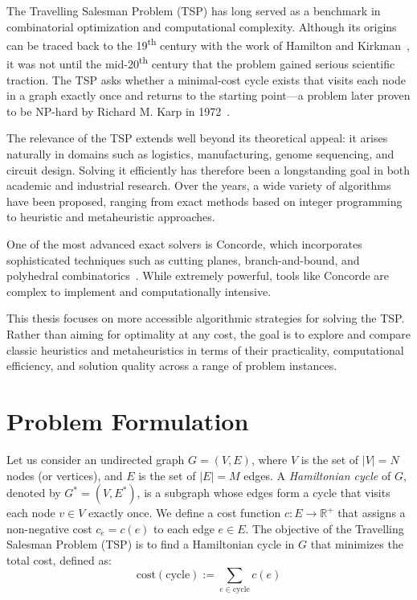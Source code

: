 The Travelling Salesman Problem (TSP) has long served as a benchmark in combinatorial optimization and computational complexity. Although its origins can be traced back to the 19\textsuperscript{th} century with the work of Hamilton and Kirkman~\cite{Biggs1986Graph}, it was not until the mid-20\textsuperscript{th} century that the problem gained serious scientific traction. The TSP asks whether a minimal-cost cycle exists that visits each node in a graph exactly once and returns to the starting point—a problem later proven to be NP-hard by Richard M. Karp in 1972~\cite{Karp1972}.

The relevance of the TSP extends well beyond its theoretical appeal: it arises naturally in domains such as logistics, manufacturing, genome sequencing, and circuit design. Solving it efficiently has therefore been a longstanding goal in both academic and industrial research. Over the years, a wide variety of algorithms have been proposed, ranging from exact methods based on integer programming to heuristic and metaheuristic approaches.

One of the most advanced exact solvers is Concorde, which incorporates sophisticated techniques such as cutting planes, branch-and-bound, and polyhedral combinatorics~\cite{Applegate2006}. While extremely powerful, tools like Concorde are complex to implement and computationally intensive.

This thesis focuses on more accessible algorithmic strategies for solving the TSP. Rather than aiming for optimality at any cost, the goal is to explore and compare classic heuristics and metaheuristics in terms of their practicality, computational efficiency, and solution quality across a range of problem instances.


\section{Problem Formulation}
\label{sec:prob-form}
Let us consider an undirected graph $G = (V, E)$, where $V$ is the set of $|V| = N$ nodes (or vertices), 
and $E$ is the set of $|E| = M$ edges. A \textit{Hamiltonian cycle} of $G$, denoted by $G^* = (V, E^*)$, 
is a subgraph whose edges form a cycle that visits each node $v \in V$ exactly once.
We define a cost function $c : E \rightarrow \mathbb{R}^+$ that assigns a non-negative cost $c_e = c(e)$ to each edge $e \in E$. 
The objective of the Travelling Salesman Problem (TSP) is to find a Hamiltonian cycle in $G$ that minimizes the total cost, defined as:
\[
\text{cost}(\text{cycle}) := \sum_{e \in \text{cycle}} c(e)
\]

